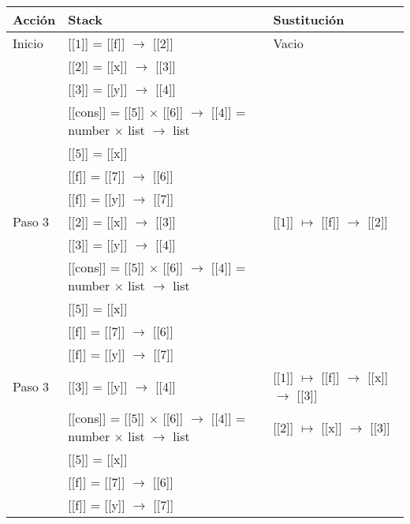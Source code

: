 \documentclass{article}
\begin{document}
\begin{center}
 \begin{longtable}{ | l | p{10 cm} | p{5 cm} | }
  \hline
  Acción & Stack & Sustitución \\ \hline \hline
  
 Inicio  & [[$\boxed{1}$]] = [[f]] $\rightarrow$ [[$\boxed{2}$]] 				& Vacio \\
	 & [[$\boxed{2}$]] = [[x]] $\rightarrow$ [[$\boxed{3}$]] 				& \\
	 & [[$\boxed{3}$]] = [[y]] $\rightarrow$ [[$\boxed{4}$]] 				& \\
	 & [[cons]] = [[$\boxed{5}$]] $\times$ [[$\boxed{6}$]] $\rightarrow$ [[$\boxed{4}$]] 
	 = number $\times$ list $\rightarrow$ list 						& \\
	 & [[$\boxed{5}$]] = [[x]]  								& \\
	 & [[f]] = [[$\boxed{7}$]] $\rightarrow$ [[$\boxed{6}$]] 				& \\
	 & [[f]] = [[y]] $\rightarrow$ [[$\boxed{7}$]] 						& \\ \hline
	 
 Paso 3  & [[$\boxed{2}$]] = [[x]] $\rightarrow$ [[$\boxed{3}$]] 				& [[$\boxed{1}$]] $\mapsto$ [[f]] $\rightarrow$ [[$\boxed{2}$]] \\
	 & [[$\boxed{3}$]] = [[y]] $\rightarrow$ [[$\boxed{4}$]] 				& \\
	 & [[cons]] = [[$\boxed{5}$]] $\times$ [[$\boxed{6}$]] $\rightarrow$ [[$\boxed{4}$]] 
	 = number $\times$ list $\rightarrow$ list 						& \\
	 & [[$\boxed{5}$]] = [[x]]  								& \\
	 & [[f]] = [[$\boxed{7}$]] $\rightarrow$ [[$\boxed{6}$]] 				& \\
	 & [[f]] = [[y]] $\rightarrow$ [[$\boxed{7}$]] 						& \\ \hline 
 
 Paso 3  & [[$\boxed{3}$]] = [[y]] $\rightarrow$ [[$\boxed{4}$]] 				& [[$\boxed{1}$]] $\mapsto$ [[f]] $\rightarrow$ [[x]] $\rightarrow$ [[$\boxed{3}$]] \\
	 & [[cons]] = [[$\boxed{5}$]] $\times$ [[$\boxed{6}$]] $\rightarrow$ [[$\boxed{4}$]] 
	 = number $\times$ list $\rightarrow$ list 						& [[$\boxed{2}$]] $\mapsto$ [[x]] $\rightarrow$ [[$\boxed{3}$]] \\
	 & [[$\boxed{5}$]] = [[x]]  								& \\
	 & [[f]] = [[$\boxed{7}$]] $\rightarrow$ [[$\boxed{6}$]] 				& \\
	 & [[f]] = [[y]] $\rightarrow$ [[$\boxed{7}$]] 						& \\ \hline 
	 

\end{longtable}
\end{center}
\end{document}
